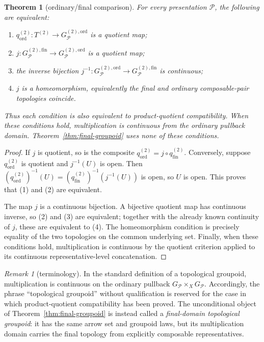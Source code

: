 \documentclass[10pt,reqno]{amsart}
\theoremstyle{definition}
\theoremstyle{plain}
\newtheorem{theorem}[definition]{Theorem}
\theoremstyle{remark}
\newtheorem{remark}[definition]{Remark}
\newcommand{\Fin}{\mathrm{fin}}
\newcommand{\Ord}{\mathrm{ord}}
\begin{document}
\begin{theorem}[ordinary/final comparison]
\label{thm:ordinary-final}
For every presentation $\mathcal P$, the following are equivalent:
\begin{enumerate}[label=(\arabic*),leftmargin=2.2em]
\item $q_{\Ord}^{(2)}:T^{(2)}\to G_{\mathcal P}^{(2),\Ord}$ is a quotient map;
\item $j:G_{\mathcal P}^{(2),\Fin}\to G_{\mathcal P}^{(2),\Ord}$ is a
  quotient map;
\item the inverse bijection $j^{-1}:G_{\mathcal P}^{(2),\Ord}\to
  G_{\mathcal P}^{(2),\Fin}$ is continuous;
\item $j$ is a homeomorphism, equivalently the final and ordinary
  composable-pair topologies coincide.
\end{enumerate}
Thus each condition is also equivalent to product-quotient compatibility.
When these conditions hold, multiplication is continuous from the ordinary
pullback domain.  Theorem~\ref{thm:final-groupoid} uses none of these
conditions.
\end{theorem}

\begin{proof}
If $j$ is quotient, so is the composite $q_{\Ord}^{(2)}=j\circ q_{\Fin}^{(2)}$.
Conversely, suppose $q_{\Ord}^{(2)}$ is quotient and $j^{-1}(U)$ is open.  Then
$(q_{\Ord}^{(2)})^{-1}(U)=(q_{\Fin}^{(2)})^{-1}(j^{-1}(U))$ is open, so $U$ is
open.  This proves that (1) and (2) are equivalent.

The map $j$ is a continuous bijection.  A bijective quotient map has
continuous inverse, so (2) and (3) are equivalent; together with the already
known continuity of $j$, these are equivalent to (4).  The homeomorphism
condition is precisely equality of the two topologies on the common
underlying set.  Finally, when these conditions hold, multiplication is
continuous by the quotient criterion applied to its continuous
representative-level concatenation.
\end{proof}

\begin{remark}[terminology]
In the standard definition of a topological groupoid, multiplication is
continuous on the ordinary pullback $G_{\mathcal P}\times_XG_{\mathcal P}$.
Accordingly, the phrase ``topological groupoid'' without qualification is
 reserved for the case in which product-quotient compatibility has been
 proved.  The unconditional object of Theorem~\ref{thm:final-groupoid} is instead called a
\emph{final-domain topological groupoid}: it has the same arrow set and
groupoid laws, but its multiplication domain carries the final topology from
explicitly composable representatives.
\end{remark}
\end{document}

